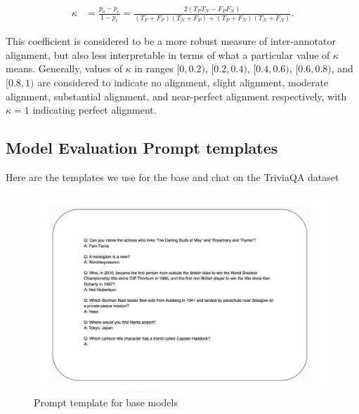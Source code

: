 \begin{align}
    \kappa &= \frac{p_o - p_e}{1 - p_e} = \frac{2(T_PT_N - F_PF_N)}{(T_P+F_P)(T_N+F_P) + (T_P+F_N)(T_N+F_N)}.
\end{align}

This coefficient is considered to be a more robust measure of inter-annotator alignment, but also less interpretable in terms of what a particular value of $\kappa$ means. Generally, values of $\kappa$ in ranges $[0, 0.2)$, $[0.2, 0.4)$, $[0.4, 0.6)$, $[0.6, 0.8)$, and $[0.8, 1)$ are considered to indicate no alignment, slight alignment, moderate alignment, substantial alignment, and near-perfect alignment respectively, with $\kappa=1$ indicating perfect alignment. 


\subsection{Model Evaluation Prompt templates}\label{app:prompt-templates}

Here are the templates we use for the base and chat \evaluatormodels on the TriviaQA dataset

\begin{figure}[h]
    \centering
    \centering
    \includegraphics[width=\linewidth]{figures/Base_prompt_template.png}
    \caption{Prompt template for base models}
    \label{app:template_pretrained}
\end{figure}


